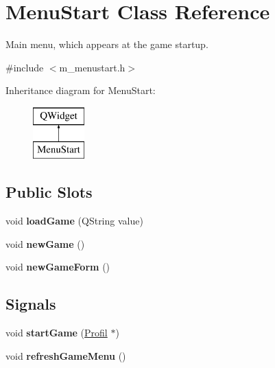 \hypertarget{class_menu_start}{}\section{Menu\+Start Class Reference}
\label{class_menu_start}


Main menu, which appears at the game startup.  




{\ttfamily \#include $<$m\+\_\+menustart.\+h$>$}

Inheritance diagram for Menu\+Start\+:\begin{figure}[H]
\begin{center}
\leavevmode
\includegraphics[height=2.000000cm]{class_menu_start}
\end{center}
\end{figure}
\subsection*{Public Slots}
\begin{DoxyCompactItemize}
\item 
\hypertarget{class_menu_start_a8af8ec946e4b575852937b469bfe3d59}{}void {\bfseries load\+Game} (Q\+String value)\label{class_menu_start_a8af8ec946e4b575852937b469bfe3d59}

\item 
\hypertarget{class_menu_start_a3ebce084546f1f9374a2e1cd0378d17a}{}void {\bfseries new\+Game} ()\label{class_menu_start_a3ebce084546f1f9374a2e1cd0378d17a}

\item 
\hypertarget{class_menu_start_a27892e476830d761fae92cc8b7db323f}{}void {\bfseries new\+Game\+Form} ()\label{class_menu_start_a27892e476830d761fae92cc8b7db323f}

\end{DoxyCompactItemize}
\subsection*{Signals}
\begin{DoxyCompactItemize}
\item 
\hypertarget{class_menu_start_a6bb370ac28c64683a712f30b19a97bc8}{}void {\bfseries start\+Game} (\hyperlink{class_profil}{Profil} $\ast$)\label{class_menu_start_a6bb370ac28c64683a712f30b19a97bc8}

\item 
\hypertarget{class_menu_start_a277ad4799e66f6b7e314d159467bc963}{}void {\bfseries refresh\+Game\+Menu} ()\label{class_menu_start_a277ad4799e66f6b7e314d159467bc963}

\end{DoxyCompactItemize}
